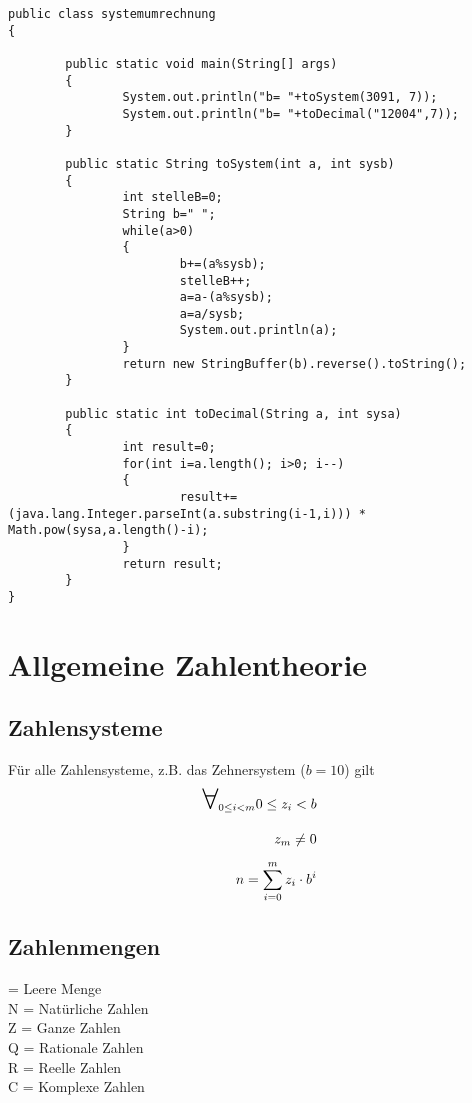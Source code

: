 \documentclass[a4paper]{scrartcl}
\newcommand\bigforall{\mbox{\huge $\forall$}}
\begin{document}
\begin{verbatim}
public class systemumrechnung
{

        public static void main(String[] args)
        {
                System.out.println("b= "+toSystem(3091, 7));
                System.out.println("b= "+toDecimal("12004",7));
        }

        public static String toSystem(int a, int sysb)
        {
                int stelleB=0;
                String b=" ";
                while(a>0)
                {
                        b+=(a%sysb);
                        stelleB++;
                        a=a-(a%sysb);
                        a=a/sysb;
                        System.out.println(a);
                }
                return new StringBuffer(b).reverse().toString();
        }

        public static int toDecimal(String a, int sysa)
        {
                int result=0;
                for(int i=a.length(); i>0; i--)
                {
                        result+=(java.lang.Integer.parseInt(a.substring(i-1,i))) * Math.pow(sysa,a.length()-i);
                }
                return result;
        }
}
\end{verbatim}

\section{Allgemeine Zahlentheorie}
\subsection{Zahlensysteme}
Für alle Zahlensysteme, z.B. das Zehnersystem ($b=10$) gilt \\
\begin{align}
\bigforall_{0 \leq i < m} 0 \leq z_i < b \\
z_m \neq 0 \\
n=\sum\limits_{i=0}^m z_i \cdot b^i \\
\end{align}

\subsection{Zahlenmengen}
{} = Leere Menge \\
N  = Natürliche Zahlen \\
Z  = Ganze Zahlen \\
Q = Rationale Zahlen \\
R = Reelle Zahlen \\
C = Komplexe Zahlen \\
\end{document}
